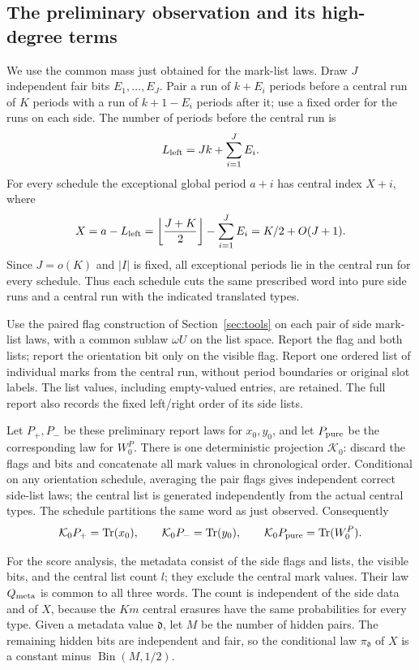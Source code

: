 \subsection{The preliminary observation and its high-degree terms}

We use the common mass just obtained for the mark-list laws. Draw \(J\) independent fair bits \(E_1,\ldots,E_J\). Pair a run of \(k+E_i\) periods before a central run of \(K\) periods with a run of \(k+1-E_i\) periods after it; use a fixed order for the runs on each side. The number of periods before the central run is
\[
 L_{\rm left}=Jk+\sum_{i=1}^J E_i.
\]
For every schedule the exceptional global period \(a+i\) has central index \(X+i\), where
\begin{equation}\label{eq:base-anchor}
 X=a-L_{\rm left}
   =\left\lfloor\frac{J+K}{2}\right\rfloor-\sum_{i=1}^J E_i
   =K/2+O(J+1).
\end{equation}
Since \(J=o(K)\) and \(|I|\) is fixed, all exceptional periods lie in the central run for every schedule. Thus each schedule cuts the same prescribed word into pure side runs and a central run with the indicated translated types.

Use the paired flag construction of Section~\ref{sec:tools} on each pair of side mark-list laws, with a common sublaw \(\omega U\) on the list space. Report the flag and both lists; report the orientation bit only on the visible flag. Report one ordered list of individual marks from the central run, without period boundaries or original slot labels. The list values, including empty-valued entries, are retained. The full report also records the fixed left/right order of its side lists.

Let \(P_+,P_-\) be these preliminary report laws for \(x_0,y_0\), and let \(P_{\rm pure}\) be the corresponding law for \(W_0^P\). There is one deterministic projection \(\mathcal K_0\): discard the flags and bits and concatenate all mark values in chronological order. Conditional on any orientation schedule, averaging the pair flags gives independent correct side-list laws; the central list is generated independently from the actual central types. The schedule partitions the same word as just observed. Consequently
\begin{equation}\label{eq:base-exact-projection}
 \mathcal K_0P_+=\mathrm{Tr}(x_0),\qquad
 \mathcal K_0P_-=\mathrm{Tr}(y_0),\qquad
 \mathcal K_0P_{\rm pure}=\mathrm{Tr}(W_0^P).
\end{equation}

For the score analysis, the metadata consist of the side flags and lists, the visible bits, and the central list count \(l\); they exclude the central mark values. Their law \(Q_{\rm meta}\) is common to all three words. The count is independent of the side data and of \(X\), because the \(Km\) central erasures have the same probabilities for every type. Given a metadata value \(\mathfrak d\), let \(M\) be the number of hidden pairs. The remaining hidden bits are independent and fair, so the conditional law \(\pi_{\mathfrak d}\) of \(X\) is a constant minus \(\operatorname{Bin}(M,1/2)\).

